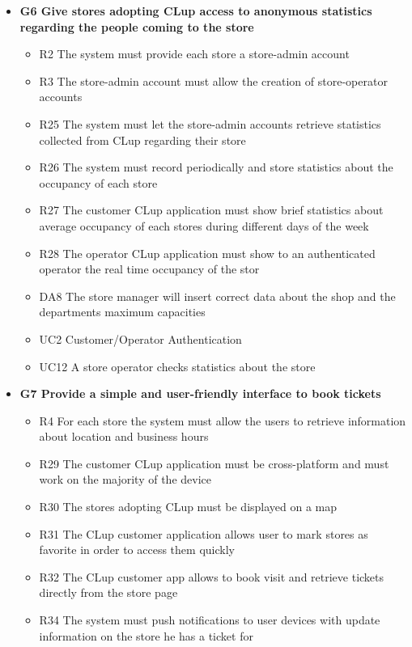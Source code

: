 \begin{itemize}
    \item \textbf{G6 Give stores adopting CLup access to anonymous statistics regarding the people coming to the store}
    \begin{itemize}
        \item R2 The system must provide each store a store-admin account
        \item R3 The store-admin account must allow the creation of store-operator accounts
        \item R25 The system must let the store-admin accounts retrieve statistics collected from CLup regarding their store 
        \item R26 The system must record periodically and store statistics about the occupancy of each store
        \item R27 The customer CLup application must show brief statistics about average occupancy of each stores during different days of the week
        \item R28 The operator CLup application must show to an authenticated operator the real time occupancy of the stor
        \medskip
        \item DA8 The store manager will insert correct data about the shop and the departments maximum capacities
        \medskip
        \item UC2 Customer/Operator Authentication 
        \item UC12 A store operator checks statistics about the store  
    \end{itemize}
    \item \textbf{G7 Provide a simple and user-friendly interface to book tickets}    
    \begin{itemize}
        \item R4 For each store the system must allow the users to retrieve information about location and business hours
        \item R29 The customer CLup application must be cross-platform and must work on the majority of the device
        \item R30 The stores adopting CLup must be displayed on a map
        \item R31 The CLup customer application allows user to mark stores as favorite in order to access them quickly
        \item R32 The CLup customer app allows to book visit and retrieve tickets directly from the store page
        \item R34 The system must push notifications to user devices with update information on the store he has a ticket for

\end{itemize}
\end{itemize}
